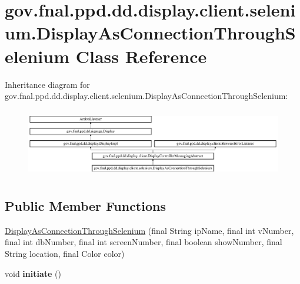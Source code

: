\hypertarget{classgov_1_1fnal_1_1ppd_1_1dd_1_1display_1_1client_1_1selenium_1_1DisplayAsConnectionThroughSelenium}{\section{gov.\-fnal.\-ppd.\-dd.\-display.\-client.\-selenium.\-Display\-As\-Connection\-Through\-Selenium Class Reference}
\label{classgov_1_1fnal_1_1ppd_1_1dd_1_1display_1_1client_1_1selenium_1_1DisplayAsConnectionThroughSelenium}
}
Inheritance diagram for gov.\-fnal.\-ppd.\-dd.\-display.\-client.\-selenium.\-Display\-As\-Connection\-Through\-Selenium\-:\begin{figure}[H]
\begin{center}
\leavevmode
\includegraphics[height=3.023758cm]{classgov_1_1fnal_1_1ppd_1_1dd_1_1display_1_1client_1_1selenium_1_1DisplayAsConnectionThroughSelenium}
\end{center}
\end{figure}
\subsection*{Public Member Functions}
\begin{DoxyCompactItemize}
\item 
\hyperlink{classgov_1_1fnal_1_1ppd_1_1dd_1_1display_1_1client_1_1selenium_1_1DisplayAsConnectionThroughSelenium_abb5c9f83153fe7d81a5dcf2c8dd88e67}{Display\-As\-Connection\-Through\-Selenium} (final String ip\-Name, final int v\-Number, final int db\-Number, final int screen\-Number, final boolean show\-Number, final String location, final Color color)
\item 
\hypertarget{classgov_1_1fnal_1_1ppd_1_1dd_1_1display_1_1client_1_1selenium_1_1DisplayAsConnectionThroughSelenium_ab305c221b590a686a18f4bd7072cf730}{void {\bfseries initiate} ()}\label{classgov_1_1fnal_1_1ppd_1_1dd_1_1display_1_1client_1_1selenium_1_1DisplayAsConnectionThroughSelenium_ab305c221b590a686a18f4bd7072cf730}

\end{DoxyCompactItemize}

